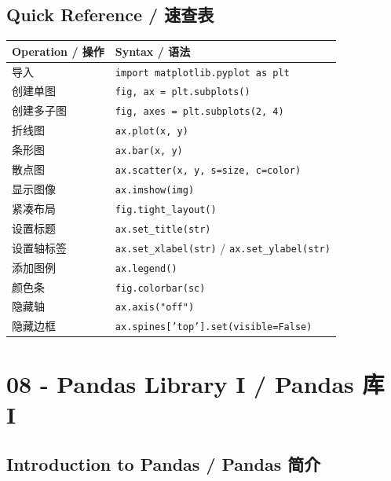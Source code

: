 \documentclass[11pt,a4paper]{report}
\let\oldtexttt\texttt
\renewcommand{\texttt}[1]{\textcolor{mainblue}{\oldtexttt{#1}}}
\begin{document}
\section{Quick Reference / 速查表}

\medskip
\centering
\small
\renewcommand{\arraystretch}{1.3}
\begin{tabular}{@{}ll@{}}
\toprule
\textbf{Operation / 操作} & \textbf{Syntax / 语法} \\ \midrule
导入 & \texttt{import matplotlib.pyplot as plt} \\
创建单图 & \texttt{fig, ax = plt.subplots()} \\
创建多子图 & \texttt{fig, axes = plt.subplots(2, 4)} \\
折线图 & \texttt{ax.plot(x, y)} \\
条形图 & \texttt{ax.bar(x, y)} \\
散点图 & \texttt{ax.scatter(x, y, s=size, c=color)} \\
显示图像 & \texttt{ax.imshow(img)} \\
紧凑布局 & \texttt{fig.tight\_layout()} \\
设置标题 & \texttt{ax.set\_title(str)} \\
设置轴标签 & \texttt{ax.set\_xlabel(str)} / \texttt{ax.set\_ylabel(str)} \\
添加图例 & \texttt{ax.legend()} \\
颜色条 & \texttt{fig.colorbar(sc)} \\
隐藏轴 & \texttt{ax.axis("off")} \\
隐藏边框 & \texttt{ax.spines['top'].set(visible=False)} \\ \bottomrule
\end{tabular}
\medskip



\chapter{08 - Pandas Library I / Pandas 库 I}



\section{Introduction to Pandas / Pandas 简介}
\end{document}
